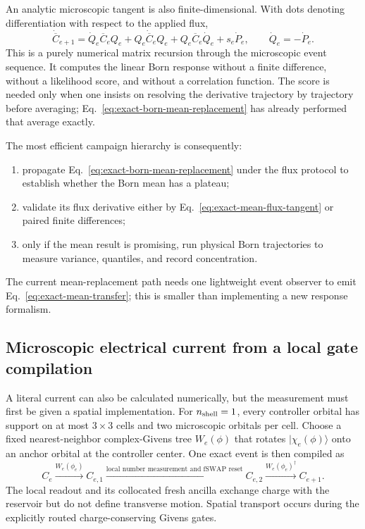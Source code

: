 \documentclass[aps,prb,onecolumn,nofootinbib,superscriptaddress]{revtex4-2}
\begin{document}
An analytic microscopic tangent is also finite-dimensional.  With dots
denoting differentiation with respect to the applied flux,
\begin{equation}
  \dot{\overline C}_{e+1}
  =\dot Q_e\overline C_eQ_e
   +Q_e\dot{\overline C}_eQ_e
   +Q_e\overline C_e\dot Q_e
   +s_e\dot P_e,
  \qquad \dot Q_e=-\dot P_e.
  \label{eq:exact-mean-flux-tangent}
\end{equation}
This is a purely numerical matrix recursion through the microscopic event
sequence.  It computes the linear Born response without a finite difference,
without a likelihood score, and without a correlation function.  The score is
needed only when one insists on resolving the derivative trajectory by
trajectory before averaging; Eq.~\eqref{eq:exact-born-mean-replacement} has
already performed that average exactly.

The most efficient campaign hierarchy is consequently:
\begin{enumerate}
  \item propagate Eq.~\eqref{eq:exact-born-mean-replacement} under the flux
  protocol to establish whether the Born mean has a plateau;
  \item validate its flux derivative either by
  Eq.~\eqref{eq:exact-mean-flux-tangent} or paired finite differences;
  \item only if the mean result is promising, run physical Born trajectories
  to measure variance, quantiles, and record concentration.
\end{enumerate}
The current mean-replacement path needs one lightweight event observer to emit
Eq.~\eqref{eq:exact-mean-transfer}; this is smaller than implementing a new
response formalism.

\subsection{Microscopic electrical current from a local gate compilation}

A literal current can also be calculated numerically, but the measurement must
first be given a spatial implementation.  For $n_{\rm shell}=1$, every
controller orbital has support on at most $3\times3$ cells and two microscopic
orbitals per cell.  Choose a fixed nearest-neighbor complex-Givens tree
$W_e(\phi)$ that rotates $|\chi_e(\phi)\rangle$ onto an anchor orbital at the
controller center.  One exact event is then compiled as
\begin{equation}
  C_e\xrightarrow{W_e(\phi_e)}C_{e,1}
  \xrightarrow{\text{local number measurement and fSWAP reset}}C_{e,2}
  \xrightarrow{W_e(\phi_e)^\dagger}C_{e+1}.
  \label{eq:local-measurement-compilation}
\end{equation}
The local readout and its collocated fresh ancilla exchange charge with the
reservoir but do not define transverse motion.  Spatial transport occurs
during the explicitly routed charge-conserving Givens gates.
\end{document}
